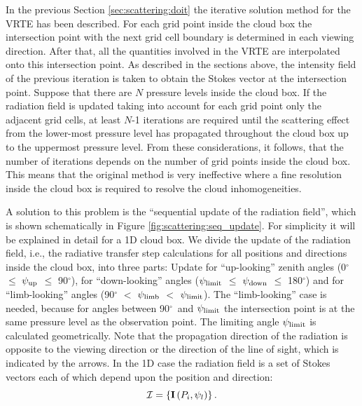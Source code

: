 In the previous Section \ref{sec:scattering:doit} the iterative solution method
for the VRTE  
has been described. For each grid point inside the cloud box the
intersection point with the next grid cell boundary is determined in
each viewing direction.  After that, all the quantities involved in the
VRTE are interpolated onto this intersection point. As described in
the sections above, the intensity field of the previous iteration is
taken to obtain the Stokes vector at the intersection point.  Suppose
that there are $N$ pressure levels inside the cloud box.  If the
radiation field is updated taking into account for each grid point
only the adjacent grid cells, at least $N$-1 iterations are required
until the scattering effect from the lower-most pressure level has
propagated throughout the cloud box up to the uppermost pressure level.
From these considerations, it follows, that the number of iterations
depends on the number of grid points inside the cloud box.  This means
that the original method is very ineffective where a fine resolution
inside the cloud box is required to resolve the cloud inhomogeneities.

A solution to this problem is the ``sequential update of the radiation
field'', which is shown schematically in Figure \ref{fig:scattering:seq_update}.
For simplicity it will be explained in detail for a 1D cloud box. We
divide the update of the radiation field, i.e., the radiative transfer
step calculations for all positions and directions inside the
cloud box, into three parts: Update for ``up-looking'' zenith angles
(0$^\circ$ $\le$ $\psi_\mathrm{up}$ $\le$ 90$^\circ$), for ``down-looking''
angles ($\psi_\mathrm{limit}$ $\le$ $\psi_\mathrm{down}$ $\le$ 180$^\circ$) and
for ``limb-looking'' angles (90$^\circ$ $<$ $\psi_\mathrm{limb}$ $<$
$\psi_\mathrm{limit}$). The ``limb-looking'' case is needed, because for
angles between 90$^\circ$\ and $\psi_\mathrm{limit}$ the intersection point
is at the same pressure level as the observation point. The limiting
angle $\psi_\mathrm{limit}$ is calculated geometrically.  Note that the
propagation direction of the radiation is opposite to the viewing
direction or the direction of the line of sight, which is indicated by the arrows.  In the
1D case the radiation field is a set of Stokes vectors each of which
depend upon the position and direction:
\begin{equation}
  {\mathcal I} = \left\{{\bf I} \left( P_i,\psi_l \right) \right\}. 
\end{equation}

